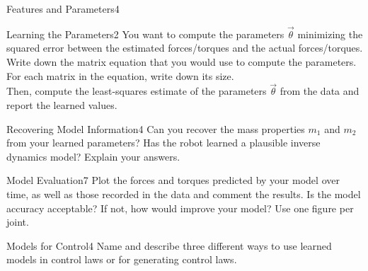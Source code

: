 \begin{questions}
\begin{question}{Features and Parameters}{4}
\begin{answer}
\end{answer}

\end{question}



\begin{question}{Learning the Parameters}{2}
You want to compute the parameters $\vec{\theta}$ minimizing the squared error between the estimated forces/torques and the actual forces/torques.
Write down the matrix equation that you would use to compute the parameters. For each matrix in the equation, write down its size.\\
Then, compute the least-squares estimate of the parameters $\vec{\theta}$ from the data and report the learned values.

\begin{answer}\end{answer}

\end{question}



\begin{question}{Recovering Model Information}{4}
	Can you recover the mass properties $m_{1}$ and $m_{2}$ from your learned parameters? Has the robot learned a plausible inverse dynamics model? Explain your answers.
	
\begin{answer}\end{answer}
\end{question}



\begin{question}{Model Evaluation}{7}
Plot the forces and torques predicted by your model over time, as well as those recorded in the data and comment the results. Is the model accuracy acceptable? If not, how would improve your model? Use one figure per joint.

\begin{answer}\end{answer}

\end{question}



\begin{question}[bonus]{Models for Control}{4}
Name and describe three different ways to use learned models in control laws or for generating control laws.


\end{question}
\end{questions}
